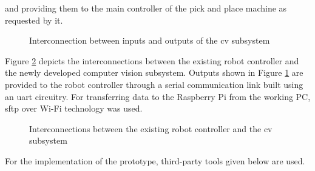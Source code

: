 \documentclass[a4paper,12pt]{report}%
\begin{document}
and providing them to the main controller of the pick and place machine as requested by it.\\ 

\begin{figure}[h]
	\centering
	
	\caption{Interconnection between inputs and outputs of the \ac{cv} subsystem}
	\label{fig:ioprocess}
\end{figure}



Figure \ref{fig:cvsubsys} depicts the interconnections between the existing robot controller and the newly developed computer vision subsystem. Outputs shown in Figure \ref{fig:ioprocess} are provided to the robot controller through a serial communication link built using an \ac{uart} circuitry. For transferring data to the Raspberry Pi from the working PC, \ac{sftp} over Wi-Fi technology was used.

\begin{figure}[h]
	\centering
	
	\caption{Interconnections between the existing robot controller and the \ac{cv} subsystem}
	\label{fig:cvsubsys}
\end{figure}

For the implementation of the prototype, third-party tools given below are used.\\
\end{document}
